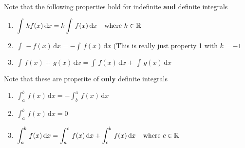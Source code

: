 \documentclass[addpoints]{exam}
\theoremstyle{definition}
\theoremstyle{plain}
\begin{document}
\begin{tcolorbox}[breakable, title=\subsection{EXTRAS}, colframe=black, sharp corners, colback=Azure4!70, colbacktitle=SlateBlue3!60, coltitle=black]
    \begin{tcolorbox}[breakable, title=\subsubsection{PROPERTIES OF INTEGRALS}, colframe=black, sharp corners, colback=Azure4!30, colbacktitle=SeaGreen3!80, coltitle=black]
        Note that the following properties hold for indefinite \textbf{and} definite integrals
        \begin{enumerate}
            \item $\displaystyle\,\int\,kf(x)\,\mathrm{d}x = k\int\,f(x)\,\mathrm{d}x \hspace{0.15in} \text{where } k\in\mathbb{R}$
            \item $\displaystyle\,\int\,-f(x)\,\mathrm{d}x = -\int\,f(x)\,\mathrm{d}x$ {\small (This is really just property 1 with $k=-1$}
            \item $\displaystyle\,\int\,f(x)\pm\,g(x)\,\mathrm{d}x = \int\,f(x)\,\mathrm{d}x\pm\,\int\,g(x)\,\mathrm{d}x$
        \end{enumerate}
    \end{tcolorbox}
    \begin{tcolorbox}[breakable, title=\subsubsection{PROPERTIES OF DEFINITE INTEGRALS}, colframe=black, sharp corners, colback=Azure4!30, colbacktitle=Magenta3!80, coltitle=black]
        Note that these are properite of \textbf{only} definite integrals
        \begin{enumerate}
            \item $\displaystyle\,\int_{a}^{b}\,f(x)\,\mathrm{d}x = -\int_{b}^{a}\,f(x)\,\mathrm{d}x$
            \item $\displaystyle\,\int_{a}^{b}\,f(x)\,\mathrm{d}x = 0$
            \item $\displaystyle\,\int_{a}^{b}\,f(x)\,\mathrm{d}x = \int_{a}^{c}\,f(x)\,\mathrm{d}x + \int_{c}^{b}\,f(x)\,\mathrm{d}x \hspace{0.15in} \text{where } c\in\mathbb{R}$
        \end{enumerate}

\end{tcolorbox}
\end{tcolorbox}
\end{document}
